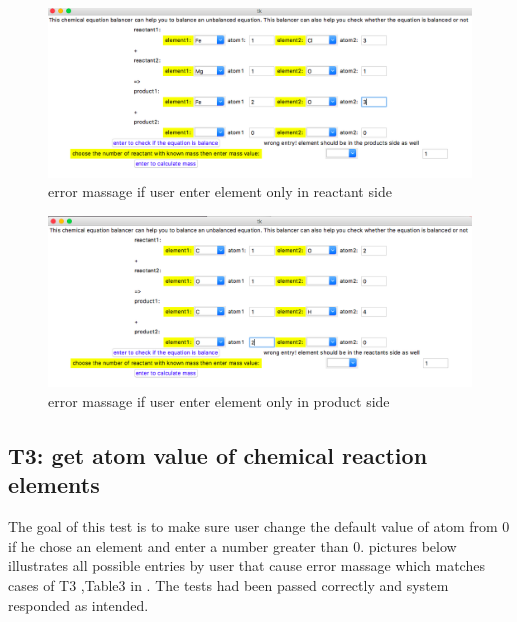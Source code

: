 \documentclass[12pt, titlepage]{article}
\begin{document}
\begin{figure}[h!]
 \begin{center}
 \includegraphics [width=\textwidth]{elementnameP}
 \caption{\label{ Figure 5:} error massage if user enter element only in reactant side}
 \end{center}
 \end{figure}
 
 \begin{figure}[h!]
 \begin{center}
 \includegraphics [width=\textwidth]{elementnameR}
 \caption{\label{ Figure 6:} error massage if user enter element only in product side}
 \end{center}
 \end{figure}
 
\subsection{T3: get atom value of chemical reaction elements}

The goal of this test is to make sure user change the default value of atom from 0 if he chose an element and enter a number greater than 0. pictures below illustrates all possible entries by user that cause error massage which matches cases of T3 ,Table3 in \cite{UnitVnVPlan}. The tests had been passed correctly and system responded as intended. 
\end{document}
